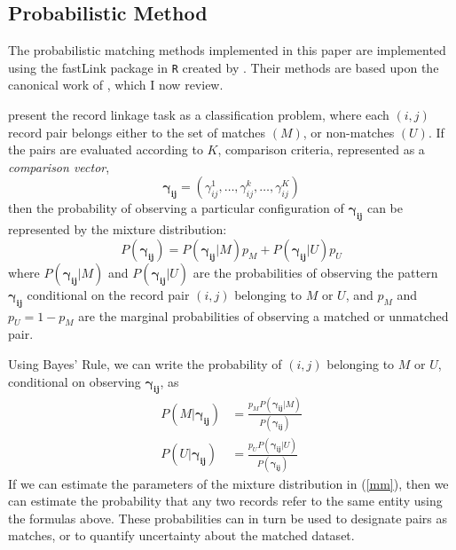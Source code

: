 \documentclass[12pt]{article}
\newcommand\gamij{\mathbf{\gamma_{ij}}}
\begin{document}
\subsection{Probabilistic Method}

The probabilistic matching methods implemented in this paper are implemented using the fastLink package in \texttt{R} created by \citet*{enamorado2019}.  Their methods are based upon the canonical work of \cite{fellegi69}, which I now review. 

\cite{fellegi69} present the record linkage task as a classification problem, where each $(i,j)$ record pair belongs either to the set of matches $(M)$, or non-matches $(U)$.  If the pairs are evaluated according to $K$,  comparison criteria, represented as a \textit{comparison vector}, $$\mathbf{\gamma_{ij}}= (\gamma_{ij}^1, \dots, \gamma_{ij}^{k}, \dots, \gamma_{ij}^K)$$ then the probability of observing a particular configuration of $\gamij$ can be represented by the mixture distribution:
\begin{equation}
P(\gamij) = P(\gamij | M) p_M + P(\gamij | U) p_U 
\label{mm}
\end{equation}
where $P(\gamij | M)$ and $P(\gamij | U)$ are the probabilities of observing the pattern $\gamij$ conditional on the record pair $(i,j)$ belonging to $M$ or $U$, and $p_M$ and $p_U = 1-p_M$ are the marginal probabilities of observing a matched or unmatched pair. 

Using Bayes' Rule, we can write the probability of $(i,j)$ belonging to $M$ or $U$, conditional on observing $\gamij$, as
\begin{align} P(M | \gamij) &= \frac{p_M P(\gamij | M)}{P(\gamij)} \\ 
P(U | \gamij) &= \frac{p_U P(\gamij | U)}{P(\gamij)}
 \end{align}
If we can estimate the parameters of the mixture distribution in (\ref{mm}), then we can estimate the probability that any two records refer to the same entity using the formulas above.  These probabilities can in turn be used to designate pairs as matches, or to quantify uncertainty about the matched dataset.  
\end{document}

